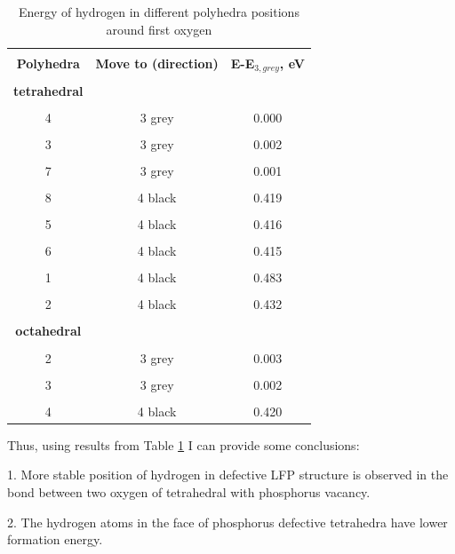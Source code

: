 \begin{table}[h]
\scriptsize{
\caption{Energy of hydrogen in different polyhedra positions around first oxygen}
\label{energy1}
\begin{center}
\begin{tabular}{|c|c|c|}
\hline
& & \\
 \textbf{Polyhedra} & \textbf{Move to (direction)} & \textbf{E-E$_{3,grey}$, eV}\\ 
\hline
& & \\
 \textbf{tetrahedral}  &  & \\ 
\hline
& & \\
4 & 3 grey & 0.000 \\
\hline
& & \\
3 & 3 grey & 0.002 \\
\hline
& & \\
7 & 3 grey & 0.001 \\
\hline
& & \\
8 & 4 black & 0.419 \\
\hline
& &\\
5 & 4 black & 0.416 \\
\hline
& & \\
6 & 4 black & 0.415 \\
\hline
& &\\
1 & 4 black & 0.483 \\
\hline
& &\\
2 & 4 black & 0.432 \\
\hline
& &\\
\textbf{octahedral} & & \\
\hline
& & \\
2 & 3 grey & 0.003 \\
\hline
& &  \\
3 & 3 grey & 0.002 \\
\hline
& & \\
4 & 4 black & 0.420 \\
\hline
\end{tabular}
\end{center}
}
\end{table}

Thus, using results from Table \ref{energy1} I can provide some conclusions:

1. More stable position of hydrogen in defective LFP structure is observed in the bond between two oxygen of tetrahedral with phosphorus vacancy.

2. The hydrogen atoms in the face of phosphorus defective tetrahedra have lower formation energy.

